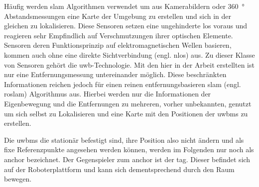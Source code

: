 Häufig werden \Gls{slam} Algorithmen verwendet um aus Kamerabildern oder \SI{360}{\degree} Abstandsmessungen eine Karte der Umgebung zu erstellen und sich in der gleichen zu lokalisieren. Diese Sensoren setzen eine ungehinderte \Gls{los} voraus und reagieren sehr Empfindlich auf Verschmutzungen ihrer optischen Elemente. Sensoren deren Funktionsprinzip auf elektromagnetischen Wellen basieren, kommen auch ohne eine direkte Sichtverbindung (engl. \Gls{nlos}) aus. Zu dieser Klasse von Sensoren gehört die \Gls{uwb}-Technologie. Mit den hier in der Arbeit erstellten  ist nur eine Entfernungsmessung untereinander möglich. Diese beschränkten Informationen reichen jedoch für einen reinen entfernungsbasieren \Gls{slam} (engl. \gls{roslam}) Algorithmus aus. Hierbei werden nur die Informationen der Eigenbewegung und die Entfernungen zu mehreren, vorher unbekannten,  genutzt um sich selbst zu Lokalisieren und eine Karte mit den Positionen der \Glspl{uwbm} zu erstellen.

Die \Glspl{uwbm} die stationär befestigt sind, ihre Position also nicht ändern und als fixe Referenzpunkte angesehen werden können, werden im Folgenden nur noch als \Gls{anchor} bezeichnet. Der Gegenspieler zum \Gls{anchor} ist der \Gls{tag}. Dieser befindet sich auf der Roboterplattform und kann sich dementsprechend durch den Raum bewegen.


%
%
%


%
%
%


%
%
